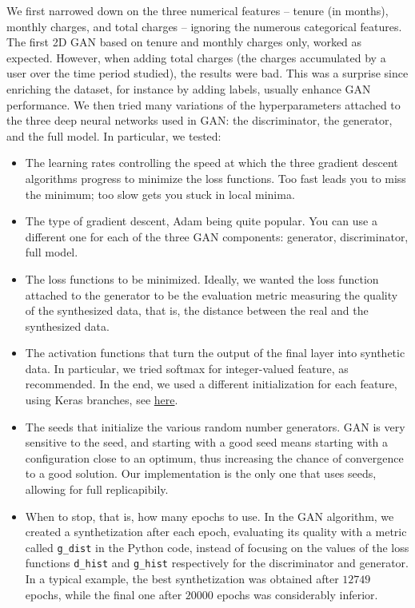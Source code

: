 \documentclass[oneside,10pt]{book}
\begin{document}
We first narrowed down on the three numerical features -- tenure (in months), monthly charges, and total charges -- ignoring the
 numerous categorical features. The first 2D GAN based on tenure and monthly charges only, worked as expected.
However, when adding total charges (the charges accumulated by a user over the time period studied), the results were bad. This was a surprise since
 enriching the dataset, for instance by adding labels, usually enhance GAN performance. We then tried many variations of the
 hyperparameters attached to the three deep neural networks used in GAN: the discriminator, the generator, and the full model. In particular,
 we tested: \vspace{1ex}
\begin{itemize}
\item The \textcolor{index}{learning rates} controlling the speed at which the three \textcolor{index}{gradient descent} algorithms progress to
 minimize the \textcolor{index}{loss functions}. Too fast leads you to miss the minimum; too slow gets you stuck in local minima.
\item The type of gradient descent, \textcolor{index}{Adam} being quite popular. You can use a different one for each of the three GAN components: generator, discriminator, full model.
\item The loss functions to be minimized. Ideally, we wanted the loss function attached to the generator to be the evaluation metric measuring the
 quality of the synthesized data, that is, the distance between the real and the synthesized data.
\item The \textcolor{index}{activation functions} that turn the output of the final layer into synthetic data. In particular,
we tried \textcolor{index}{softmax} for integer-valued feature, as recommended. In the end, we used
 a different initialization for each feature, using Keras branches, see \href{https://github.com/VincentGranville/Notebooks/blob/main/GAN_Telecom_test2.ipynb}{here}.
\item The \textcolor{index}{seeds} that initialize the various random number generators. GAN is very sensitive to the seed, and starting with a good seed means starting with a configuration close to an optimum, thus increasing the chance of convergence to a good solution. Our implementation is the only one that uses seeds, allowing for full replicapibily.
\item When to stop, that is, how many \textcolor{index}{epochs} to use.  In the GAN algorithm, we created a synthetization after each epoch, evaluating its quality with a metric called \texttt{g\_dist} in the Python code, instead of focusing on the values
 of the loss functions \texttt{d\_hist} and \texttt{g\_hist} respectively for the discriminator and generator. In a typical example, the best synthetization was obtained after $\num{12749}$ epochs, while the final one after $\num{20000}$ epochs was considerably inferior.
\end{itemize} \vspace{1ex}
\end{document}
